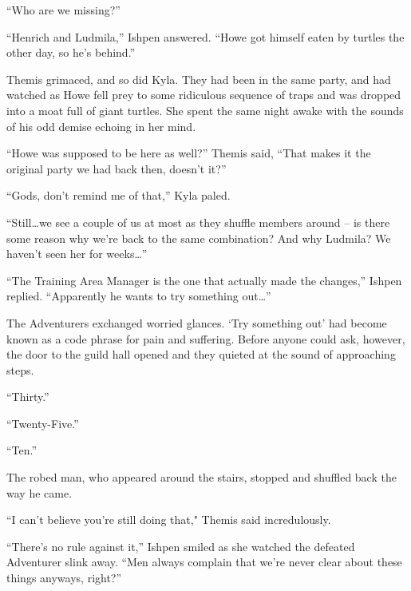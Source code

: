  

“Who are we missing?”

 

“Henrich and Ludmila,” Ishpen answered. “Howe got himself eaten by turtles the other day, so he’s behind.”

 

Themis grimaced, and so did Kyla. They had been in the same party, and had watched as Howe fell prey to some ridiculous sequence of traps and was dropped into a moat full of giant turtles. She spent the same night awake with the sounds of his odd demise echoing in her mind.

 

“Howe was supposed to be here as well?” Themis said, “That makes it the original party we had back then, doesn’t it?”

 

“Gods, don’t remind me of that,” Kyla paled.

 

“Still…we see a couple of us at most as they shuffle members around – is there some reason why we’re back to the same combination? And why Ludmila? We haven’t seen her for weeks…”

 

“The Training Area Manager is the one that actually made the changes,” Ishpen replied. “Apparently he wants to try something out…”

 

The Adventurers exchanged worried glances. ‘Try something out’ had become known as a code phrase for pain and suffering. Before anyone could ask, however, the door to the guild hall opened and they quieted at the sound of approaching steps.

 

“Thirty.”

 

“Twenty-Five.”

 

“Ten.”

 

The robed man, who appeared around the stairs, stopped and shuffled back the way he came.

 

“I can't believe you're still doing that," Themis said incredulously.

 

“There’s no rule against it,” Ishpen smiled as she watched the defeated Adventurer slink away. “Men always complain that we’re never clear about these things anyways, right?”

